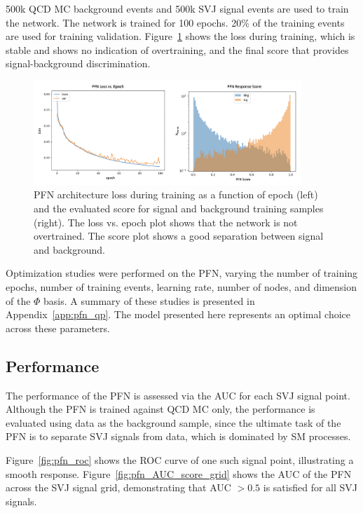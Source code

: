 500k QCD MC background events and 500k SVJ signal events are used to train the network. The network is trained for 100 epochs. 20\% of the training events are used for training validation. Figure~\ref{fig:pfn_loss} shows the loss during training, which is stable and shows no indication of overtraining, and the final score that provides signal-background discrimination.

\begin{figure}[!htbp]
\centering
   \includegraphics[width=0.9\textwidth]{figures/ml/pfn_loss_score}    
    \caption{PFN architecture loss during training as a function of epoch (left) and the evaluated score for signal and background training samples (right). The loss vs. epoch plot shows that the network is not overtrained. The score plot shows a good separation between signal and background.
    \label{fig:pfn_loss}}
\end{figure}

Optimization studies were performed on the PFN, varying the number of training epochs, number of training events, learning rate, number of nodes, and dimension of the $\Phi$ basis. A summary of these studies is presented in Appendix~\ref{app:pfn_qp}. The model presented here represents an optimal choice across these parameters.

\subsection{Performance}
\label{sec:pfn_performance}

The performance of the PFN is assessed via the AUC for each SVJ signal point.
Although the PFN is trained against QCD MC only, the performance is evaluated using data as the background sample, since the ultimate task of the PFN is to separate SVJ signals from data, which is dominated by SM processes.

Figure~\ref{fig:pfn_roc} shows the ROC curve of one such signal point, illustrating a smooth response.
Figure~\ref{fig:pfn_AUC_score_grid} shows the AUC of the PFN across the SVJ signal grid, demonstrating that AUC $>0.5$ is satisfied for all SVJ signals.

